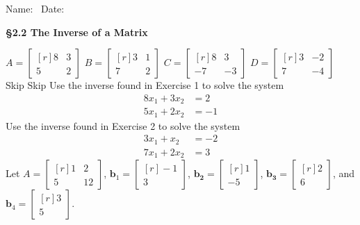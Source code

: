 \documentclass[11pt,answers]{exam} %
\renewcommand{\vec}[1]{\mathbf{#1}}
\newcommand{\mat}[1]{\begin{bmatrix*}[r] #1 \end{bmatrix*}}
\begin{document}
\flushleft
Name:\ \makebox[4in]{\hrulefill} \hspace{1in} Date:\ \makebox[1in]{\hrulefill}
\begin{center}
    \textbf{\S 2.2 The Inverse of a Matrix}
\end{center}


\begin{questions}
    \question $A = \mat{8 & 3 \\ 5 & 2}$
    \question $B = \mat{3 & 1 \\ 7 & 2}$
    \question $C = \mat{8 & 3 \\ -7 & -3}$
    \question $D = \mat{3 & -2 \\ 7 & -4}$
    \question Skip
    \question Skip
    \question Use the inverse found in Exercise 1 to solve the system
    \begin{eqnarray*}
        8x_1 + 3x_2 &= 2 \\
        5x_1 + 2x_2 &= -1
    \end{eqnarray*}
        \question Use the inverse found in Exercise 2 to solve the system
    \begin{eqnarray*}
        3x_1 + x_2 &= -2 \\
        7x_1 + 2x_2 &= 3
    \end{eqnarray*}
    \question Let $A = \mat{1 & 2 \\ 5 & 12}$, \hspace{1cm} $\vec{b}_1 = \mat{-1 \\ 3}$, \hspace{1cm} $\vec{b_2} = \mat{1 \\ -5}$, $\vec{b_3} = \mat{2 \\ 6}$, and $\vec{b}_4 = \mat{3 \\ 5}$.
\end{questions}
\end{document}
